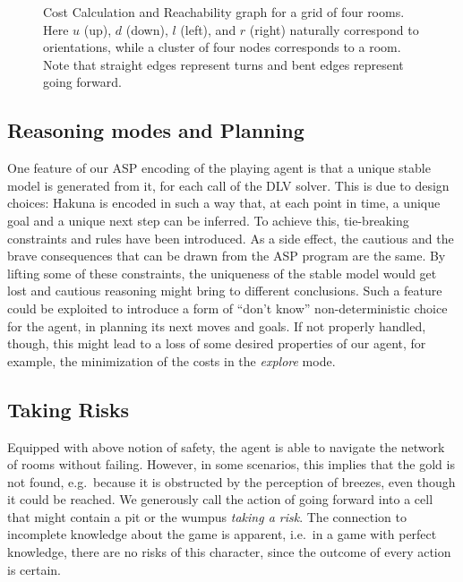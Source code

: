 \documentclass{llncs}
\begin{document}

\begin{figure}
	\begin{center}
		
	\end{center}
	\caption[Cost Calculation and Reachability graph]{Cost Calculation and Reachability graph for a grid of four rooms. Here $u$ (up), $d$ (down), $l$ (left), and $r$ (right) naturally correspond to orientations, while a cluster of four nodes corresponds to a room. Note that straight edges represent turns and bent edges represent going forward.}
	\label{fig:graph}
\end{figure}

\subsection{Reasoning modes and Planning}

One feature of our ASP encoding of the playing agent is that a unique stable model is generated from it, for each call of the DLV solver.
This is due to design choices: Hakuna is encoded in such a way that, at each point in time, a unique goal and a unique next step can be inferred.
To achieve this, tie-breaking constraints and rules have been introduced.
As a side effect, the cautious and the brave consequences that can be drawn from the ASP program are the same.
By lifting some of these constraints, the uniqueness of the stable model would get lost and cautious reasoning might bring to different conclusions.
Such a feature could be exploited to introduce a form of ``don't know'' non-deterministic choice for the agent, in planning its next moves and goals.
If not properly handled, though, this might lead to a loss of some desired properties of our agent, for example, the minimization of the costs in the \emph{explore} mode.

\subsection{Taking Risks}
Equipped with above notion of safety, the agent is able to navigate the network of rooms without failing. However, in some scenarios, this implies that the gold is not found, e.g.\ because it is obstructed by the perception of breezes, even though it could be reached. We generously call the action of going forward into a cell that might contain a pit or the wumpus \emph{taking a risk}. The connection to incomplete knowledge about the game is apparent, i.e.\ in a game with perfect knowledge, there are no risks of this character, since the outcome of every action is certain.
\end{document}
